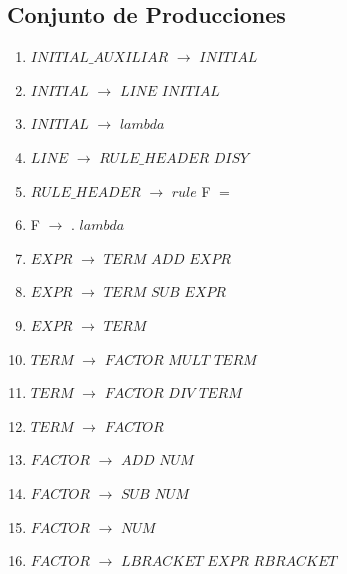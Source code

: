 \noindent



\newpage
\subsection{Conjunto de Producciones}

\begin{enumerate}
\item $INITIAL\_AUXILIAR$ $\rightarrow$ $INITIAL$ \\
\item $INITIAL$   $\rightarrow$  $LINE$ $INITIAL$ \\
\item $INITIAL$   $\rightarrow$  $lambda$ \\
\item $LINE$   $\rightarrow$  $RULE\_HEADER$ $DISY$ \\
\item $RULE\_HEADER$ 	$\rightarrow$	$rule$ F $=\ $ \\
\item F	 $\rightarrow$	. \textbar  $lambda$ \\

\item $EXPR$ $\rightarrow$ $TERM$ $ADD$ $EXPR$ \\
\item $EXPR$ $\rightarrow$ $TERM$ $SUB$ $EXPR$ \\
\item $EXPR$ $\rightarrow$ $TERM$ \\

\item $TERM$ $\rightarrow$ $FACTOR$ $MULT$ $TERM$\\
\item $TERM$ $\rightarrow$ $FACTOR$ $DIV$ $TERM$\\
\item $TERM$ $\rightarrow$ $FACTOR$\\

\item $FACTOR$ $\rightarrow$ $ADD$ $NUM$ \\
\item $FACTOR$ $\rightarrow$ $SUB$ $NUM$ \\
\item $FACTOR$ $\rightarrow$ $NUM$ \\
\item $FACTOR$ $\rightarrow$ $LBRACKET$ $EXPR$ $RBRACKET$\\


\end{enumerate}
